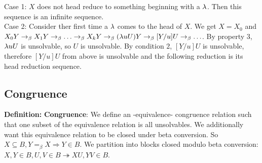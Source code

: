 Case 1: $X$ does not head reduce to something beginning with a $\lambda$. Then this sequence is an infinite sequence.\\

Case 2: Consider ther first time a $\lambda$ comes to the head of $X$. We get $X = X_0$ and $X_0Y \rightarrow_\beta X_1Y \rightarrow_\beta \ldots \rightarrow_\beta X_kY \rightarrow_\beta (\lambda uU)Y \rightarrow_\beta [Y/u]U \rightarrow_\beta \ldots$. By property $3$, $\lambda uU$ is unsolvable, so $U$ is unsolvable. By condition $2$, $[Y/u]U$ is unsolvable, therefore $[Y/u]U$ from above is unsolvable and the following reduction is its head reduction sequence.\\

\subsection{Congruence}
\textbf{Definition:} \textbf{Congruence}: We define an -equivalence- congruence relation such that one subset of the equivalence relation is all unsolvables. We additionally want this equivalence relation to be closed under beta conversion. So $X \subseteq B, Y =_\beta X \Rightarrow Y \in B$. We partition into blocks closed modulo beta conversion: $X,Y \in B, U,V \in B \twoheadrightarrow XU, YV \in B$.\\